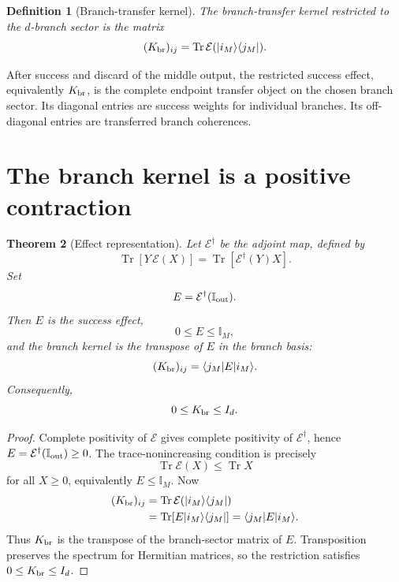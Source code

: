 \documentclass[reprint,aps,pra,superscriptaddress,nofootinbib,longbibliography]{revtex4-2}
\newtheorem{theorem}{Theorem}
\newtheorem{definition}[theorem]{Definition}
\newcommand{\ket}[1]{|#1\rangle}
\newcommand{\bra}[1]{\langle #1|}
\newcommand{\Tr}{\operatorname{Tr}}
\newcommand{\Id}{\mathbb I}
\newcommand{\EE}{\mathcal E}
\begin{document}
\begin{definition}[Branch-transfer kernel]
The branch-transfer kernel restricted to the \(d\)-branch sector is the matrix
\begin{equation}
(K_{\rm br})_{ij}
=
\Tr\EE(\ket{i_M}\bra{j_M}).
\label{eq:kernel-def}
\end{equation}
\end{definition}

After success and discard of the middle output, the restricted success effect, equivalently \(K_{\rm br}\), is the complete endpoint transfer object on the chosen branch sector.  Its diagonal entries are success weights for individual branches.  Its off-diagonal entries are transferred branch coherences.

\section{The branch kernel is a positive contraction}
\label{sec:kernel}

\begin{theorem}[Effect representation]
Let \(\EE^\dagger\) be the adjoint map, defined by
\[
\Tr[Y\,\EE(X)]=\Tr[\EE^\dagger(Y)X].
\]
Set
\begin{equation}
E=\EE^\dagger(\Id_{\rm out}).
\label{eq:success-effect}
\end{equation}
Then \(E\) is the success effect,
\[
0\le E\le \Id_M,
\]
and the branch kernel is the transpose of \(E\) in the branch basis:
\begin{equation}
(K_{\rm br})_{ij}=\bra{j_M}E\ket{i_M}.
\label{eq:kernel-effect}
\end{equation}
Consequently,
\begin{equation}
0\le K_{\rm br}\le I_d.
\label{eq:kernel-contraction}
\end{equation}
\end{theorem}

\begin{proof}
Complete positivity of \(\EE\) gives complete positivity of \(\EE^\dagger\), hence \(E=\EE^\dagger(\Id_{\rm out})\ge0\).  The trace-nonincreasing condition is precisely
\[
\Tr\EE(X)\le \Tr X
\]
for all \(X\ge0\), equivalently \(E\le \Id_M\).  Now
\[
\begin{aligned}
(K_{\rm br})_{ij}
&=
\Tr\EE(\ket{i_M}\bra{j_M})
\\
&=
\Tr[E\ket{i_M}\bra{j_M}]
=
\bra{j_M}E\ket{i_M}.
\end{aligned}
\]
Thus \(K_{\rm br}\) is the transpose of the branch-sector matrix of \(E\).  Transposition preserves the spectrum for Hermitian matrices, so the restriction satisfies \(0\le K_{\rm br}\le I_d\).
\end{proof}
\end{document}
